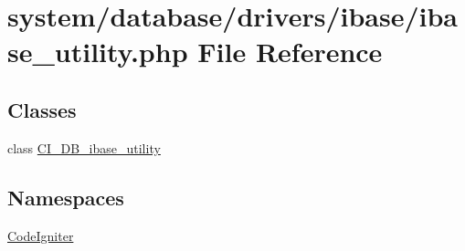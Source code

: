 \hypertarget{ibase__utility_8php}{}\section{system/database/drivers/ibase/ibase\+\_\+utility.php File Reference}
\label{ibase__utility_8php}
\subsection*{Classes}
\begin{DoxyCompactItemize}
\item 
class \mbox{\hyperlink{class_c_i___d_b__ibase__utility}{C\+I\+\_\+\+D\+B\+\_\+ibase\+\_\+utility}}
\end{DoxyCompactItemize}
\subsection*{Namespaces}
\begin{DoxyCompactItemize}
\item 
 \mbox{\hyperlink{namespace_code_igniter}{Code\+Igniter}}
\end{DoxyCompactItemize}
